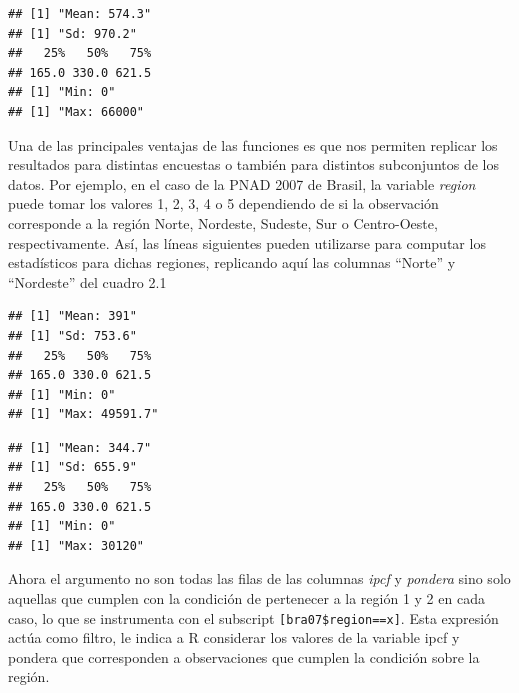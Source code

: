 \documentclass[
]{book}
\newenvironment{Shaded}{\begin{snugshade}}{\end{snugshade}}
\newcommand{\DecValTok}[1]{\textcolor[rgb]{0.00,0.00,0.81}{#1}}
\newcommand{\FunctionTok}[1]{\textcolor[rgb]{0.00,0.00,0.00}{#1}}
\newcommand{\NormalTok}[1]{#1}
\newcommand{\SpecialCharTok}[1]{\textcolor[rgb]{0.00,0.00,0.00}{#1}}
\begin{document}
\begin{verbatim}
## [1] "Mean: 574.3"
## [1] "Sd: 970.2"
##   25%   50%   75% 
## 165.0 330.0 621.5 
## [1] "Min: 0"
## [1] "Max: 66000"
\end{verbatim}

Una de las principales ventajas de las funciones es que nos permiten replicar los resultados para distintas encuestas o también para distintos subconjuntos de los datos. Por ejemplo, en el caso de la PNAD 2007 de Brasil, la variable \emph{region} puede tomar los valores 1, 2, 3, 4 o 5 dependiendo de si la observación corresponde a la región Norte, Nordeste, Sudeste, Sur o Centro-Oeste, respectivamente. Así, las líneas siguientes pueden utilizarse para computar los estadísticos para dichas regiones, replicando aquí las columnas ``Norte'' y ``Nordeste'' del cuadro 2.1

\begin{Shaded}
\end{Shaded}

\begin{verbatim}
## [1] "Mean: 391"
## [1] "Sd: 753.6"
##   25%   50%   75% 
## 165.0 330.0 621.5 
## [1] "Min: 0"
## [1] "Max: 49591.7"
\end{verbatim}

\begin{Shaded}
\end{Shaded}

\begin{verbatim}
## [1] "Mean: 344.7"
## [1] "Sd: 655.9"
##   25%   50%   75% 
## 165.0 330.0 621.5 
## [1] "Min: 0"
## [1] "Max: 30120"
\end{verbatim}

Ahora el argumento no son todas las filas de las columnas \emph{ipcf} y \emph{pondera} sino solo aquellas que cumplen con la condición de pertenecer a la región 1 y 2 en cada caso, lo que se instrumenta con el subscript \texttt{{[}bra07\$region==x{]}}. Esta expresión actúa como filtro, le indica a R considerar los valores de la variable ipcf y pondera que corresponden a observaciones que cumplen la condición sobre la región.
\end{document}
